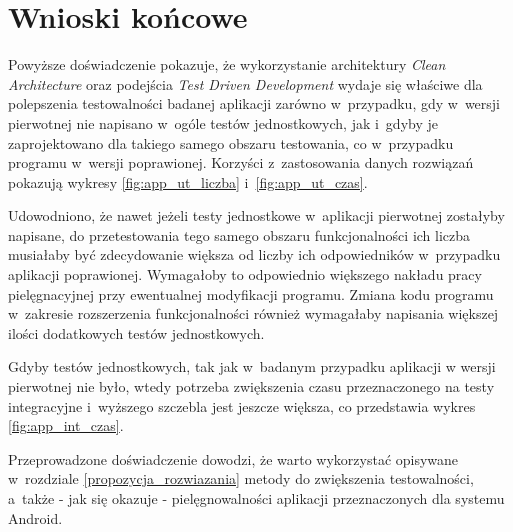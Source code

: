 \newpage
\section{Wnioski końcowe}
Powyższe doświadczenie pokazuje, że wykorzystanie architektury \textit{Clean Architecture} oraz podejścia \textit{Test Driven Development} wydaje się właściwe dla polepszenia testowalności badanej aplikacji zarówno w~przypadku, gdy w~wersji pierwotnej nie napisano w~ogóle testów jednostkowych, jak i~gdyby je zaprojektowano dla takiego samego obszaru testowania, co w~przypadku programu w~wersji poprawionej. Korzyści z~zastosowania danych rozwiązań pokazują wykresy \ref{fig:app_ut_liczba} i~\ref{fig:app_ut_czas}.

Udowodniono, że nawet jeżeli testy jednostkowe w~aplikacji pierwotnej zostałyby napisane, do przetestowania tego samego obszaru funkcjonalności ich liczba musiałaby być zdecydowanie większa od liczby ich odpowiedników w~przypadku aplikacji poprawionej. Wymagałoby to odpowiednio większego nakładu pracy pielęgnacyjnej przy ewentualnej modyfikacji programu. Zmiana kodu programu w~zakresie rozszerzenia funkcjonalności również wymagałaby napisania większej ilości dodatkowych testów jednostkowych.

Gdyby testów jednostkowych, tak jak w~badanym przypadku aplikacji w wersji pierwotnej nie było, wtedy potrzeba zwiększenia czasu przeznaczonego na testy integracyjne i~wyższego szczebla jest jeszcze większa, co przedstawia wykres \ref{fig:app_int_czas}.

Przeprowadzone doświadczenie dowodzi, że warto wykorzystać opisywane w~rozdziale \ref{propozycja_rozwiazania} metody do zwiększenia testowalności, a~także - jak się okazuje - pielęgnowalności aplikacji przeznaczonych dla systemu Android. 